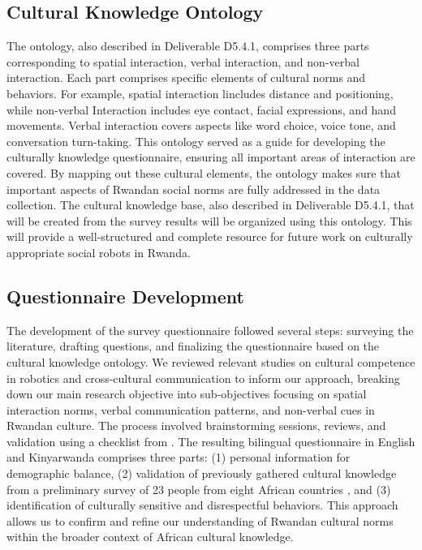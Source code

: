 \documentclass{CSSRforAfrica}
\begin{document}
\subsection{Cultural Knowledge Ontology}
 \label{section:ontology}
 
The ontology, also  described in Deliverable D5.4.1, comprises  three  parts corresponding to spatial interaction, verbal interaction, and non-verbal interaction. Each part comprises specific elements of cultural norms and behaviors. For example, spatial interaction lincludes distance and positioning, while non-verbal Interaction includes eye contact, facial expressions, and hand movements. Verbal interaction covers aspects like word choice, voice tone, and conversation turn-taking. This  ontology served as a guide for developing the culturally knowledge questionnaire, ensuring all important areas of interaction are covered. By mapping out these cultural elements, the ontology makes sure that important aspects of Rwandan social norms are fully addressed in the data collection. The cultural knowledge base, also described in Deliverable D5.4.1, that will be created from the survey results will be organized using this ontology. This will provide a well-structured and complete resource for future work on culturally appropriate social robots in Rwanda.

\subsection{Questionnaire Development}
 \label{section:development}

The development of the survey questionnaire followed several steps: surveying the literature, drafting questions, and finalizing the questionnaire based on the cultural knowledge ontology. We reviewed relevant studies on cultural competence in robotics and cross-cultural communication to inform our approach, breaking down our main research objective into sub-objectives focusing on spatial interaction norms, verbal communication patterns, and non-verbal cues in Rwandan culture. The process involved brainstorming sessions, reviews, and validation using a checklist from \cite{Bradburn2004}. The resulting bilingual questionnaire in English and Kinyarwanda comprises three parts: (1) personal information for demographic balance, (2) validation of previously gathered cultural knowledge from a preliminary survey of 23 people from eight African countries \cite{ZantouVernon2023}, and (3) identification of culturally sensitive and disrespectful behaviors. This approach allows us to confirm and refine our understanding of Rwandan cultural norms within the broader context of African cultural knowledge. 
\end{document}
